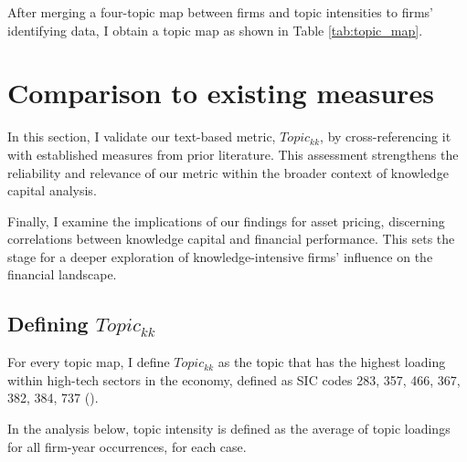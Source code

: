 \documentclass[12pt, letterpaper]{article}
\begin{document}
After merging a four-topic map between firms and topic intensities to firms' identifying data, I obtain a topic map as shown in Table \ref{tab:topic_map}.

\tiny

\normalsize







\section{Comparison to existing measures}

In this section, I validate our text-based metric, $Topic_{kk}$, by cross-referencing it with established measures from prior literature. This assessment strengthens the reliability and relevance of our metric within the broader context of knowledge capital analysis.

Finally, I examine the implications of our findings for asset pricing, discerning correlations between knowledge capital and financial performance. This sets the stage for a deeper exploration of knowledge-intensive firms' influence on the financial landscape.

\subsection{Defining $Topic_{kk}$}

For every topic map, I define $Topic_{kk}$ as the topic that has the highest loading within high-tech sectors in the economy, defined as SIC codes 283, 357, 466, 367, 382, 384, 737 (\cite{Brown2009-zp}). 

In the analysis below, topic intensity is defined as the average of topic loadings for all firm-year occurrences, for each case.
\end{document}
